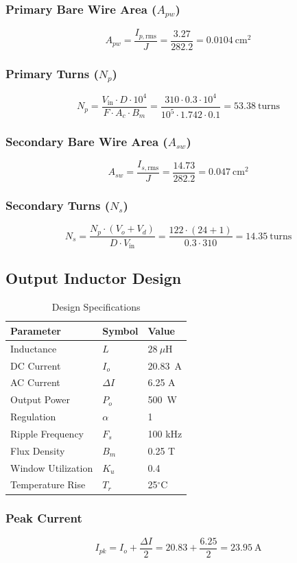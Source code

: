\subsubsection*{Primary Bare Wire Area (\(A_{pw}\))}
\[
A_{pw} = \frac{I_{p,\text{rms}}}{J} = \frac{3.27}{282.2} = \SI{0.0104}{\centi\meter\squared}
\]
\subsubsection*{Primary Turns (\(N_p\))}
\[
N_p = \frac{V_{\text{in}} \cdot D \cdot 10^4}{F \cdot A_c \cdot B_m} =\frac{310 \cdot 0.3 \cdot 10^4}{10^5 \cdot 1.742 \cdot 0.1} = 53.38 \ \text{turns}
\]
\subsubsection*{Secondary Bare Wire Area (\(A_{sw}\))}
\[
A_{sw} = \frac{I_{s,\text{rms}}}{J} = \frac{14.73}{282.2} = \SI{0.047}{\centi\meter\squared}
\]
\subsubsection*{Secondary Turns (\(N_s\))}
\[
N_s = \frac{N_p \cdot (V_o + V_d)}{D \cdot V_{\text{in}}} = \frac{122 \cdot (24 + 1)}{0.3 \cdot 310} = 14.35\ \text{turns}
\]
\subsection{Output Inductor Design}
\begin{table}[h]
\centering
\caption{Design Specifications}
\begin{tabular}{lll}
\toprule
\textbf{Parameter} & \textbf{Symbol} & \textbf{Value} \\
\midrule
Inductance & $L$ & $28\ \mu$H \\
DC Current & $I_o$ & 20.83\ A \\
AC Current & $\Delta I$ & 6.25 A \\
Output Power & $P_o$ & 500\ W \\
Regulation & $\alpha$ & 1 \\
Ripple Frequency & $F_s$ & 100 kHz\\
Flux Density & $B_m$ & 0.25 T \\
Window Utilization & $K_u$ & 0.4 \\
Temperature Rise & $T_r$ & 25$^\circ$C \\
\bottomrule
\end{tabular}
\end{table}
\subsubsection*{Peak Current}
\[
I_{pk} = I_o + \frac{\Delta I}{2} = 20.83 + \frac{6.25}{2} = 23.95\ \text{A}
\]
